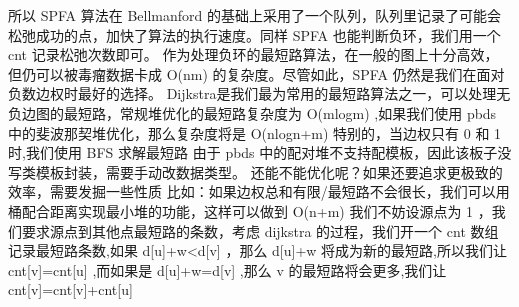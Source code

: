 {}所以 \markdownRendererDollarSign{}SPFA\markdownRendererDollarSign{} 算法在 \markdownRendererDollarSign{}Bellmanford\markdownRendererDollarSign{} 的基础上采用了一个队列，队列里记录了可能会松弛成功的点，加快了算法的执行速度。同样 \markdownRendererDollarSign{}SPFA\markdownRendererDollarSign{} 也能判断负环，我们用一个 \markdownRendererDollarSign{}cnt\markdownRendererDollarSign{} 记录松弛次数即可。\markdownRendererParagraphSeparator
{}作为处理负环的最短路算法，在一般的图上十分高效，但仍可以被毒瘤数据卡成 \markdownRendererDollarSign{}O(nm)\markdownRendererDollarSign{} 的复杂度。尽管如此，\markdownRendererDollarSign{}SPFA\markdownRendererDollarSign{} 仍然是我们在面对负数边权时最好的选择。\markdownRendererInterblockSeparator
{}\markdownRendererInterblockSeparator
{}
\markdownRendererSectionEnd \markdownRendererSectionBegin
{}\markdownRendererInterblockSeparator
{}Dijkstra是我们最为常用的最短路算法之一，可以处理无负边图的最短路，常规堆优化的最短路复杂度为\markdownRendererDollarSign{} O(mlogm) \markdownRendererDollarSign{},如果我们使用\markdownRendererDollarSign{} pbds \markdownRendererDollarSign{}中的斐波那契堆优化，那么复杂度将是\markdownRendererDollarSign{} O(nlogn+m) \markdownRendererDollarSign{}\markdownRendererParagraphSeparator
{}特别的，当边权只有\markdownRendererDollarSign{} 0 \markdownRendererDollarSign{}和\markdownRendererDollarSign{} 1 \markdownRendererDollarSign{}时,我们使用\markdownRendererDollarSign{} BFS\markdownRendererSoftLineBreak
{}\markdownRendererDollarSign{}求解最短路\markdownRendererParagraphSeparator
{}由于\markdownRendererDollarSign{} pbds \markdownRendererDollarSign{}中的配对堆不支持配模板，因此该板子没写类模板封装，需要手动改数据类型。\markdownRendererInterblockSeparator
{}\markdownRendererInterblockSeparator
{}还能不能优化呢？如果还要追求更极致的效率，需要发掘一些性质\markdownRendererParagraphSeparator
{}比如：如果边权总和有限/最短路不会很长，我们可以用桶配合距离实现最小堆的功能，这样可以做到\markdownRendererDollarSign{} O(n+m) \markdownRendererDollarSign{}\markdownRendererInterblockSeparator
{}
\markdownRendererSectionEnd \markdownRendererSectionBegin
{}\markdownRendererInterblockSeparator
{}我们不妨设源点为\markdownRendererDollarSign{} 1 \markdownRendererDollarSign{}，我们要求源点到其他点最短路的条数，考虑\markdownRendererDollarSign{} dijkstra \markdownRendererDollarSign{}的过程，我们开一个\markdownRendererDollarSign{} cnt \markdownRendererDollarSign{}数组记录最短路条数,如果\markdownRendererDollarSign{} d[u]+w<d[v] \markdownRendererDollarSign{}，那么\markdownRendererDollarSign{} d[u]+w \markdownRendererDollarSign{}将成为新的最短路,所以我们让\markdownRendererDollarSign{} cnt[v]=cnt[u] \markdownRendererDollarSign{},而如果是\markdownRendererDollarSign{} d[u]+w=d[v] \markdownRendererDollarSign{},那么\markdownRendererDollarSign{} v \markdownRendererDollarSign{}的最短路将会更多,我们让\markdownRendererDollarSign{} cnt[v]=cnt[v]+cnt[u] \markdownRendererDollarSign{}\markdownRendererParagraphSeparator

